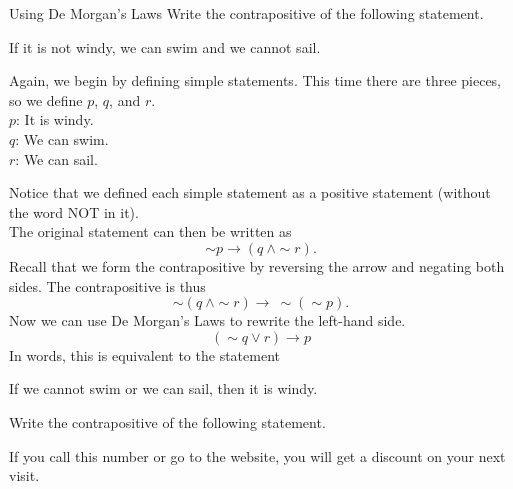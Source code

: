 \begin{example}[https://www.youtube.com/watch?v=VAPnT_9vxds]{Using De Morgan's Laws}
Write the contrapositive of the following statement.
\begin{center}
If it is not windy, we can swim and we cannot sail.
\end{center}

\sol
Again, we begin by defining simple statements.  This time there are three pieces, so we define $p$, $q$, and $r$.\\
$p$: It is windy.\\
$q$: We can swim.\\
$r$: We can sail.

Notice that we defined each simple statement as a positive statement (without the word NOT in it).\\

The original statement can then be written as \[\sim p \to (q\ \wedge \sim r).\]
Recall that we form the contrapositive by reversing the arrow and negating both sides.  The contrapositive is thus
\[\sim (q\ \wedge \sim r) \to\ \sim (\sim p).\]
Now we can use De Morgan's Laws to rewrite the left-hand side.
\[(\sim q \vee r) \to p\]
In words, this is equivalent to the statement
\begin{center}
If we cannot swim or we can sail, then it is windy.
\end{center}
\end{example}

\begin{try}
Write the contrapositive of the following statement.
\begin{center}
If you call this number or go to the website, you will get a discount on your next visit.
\end{center}
\end{try}